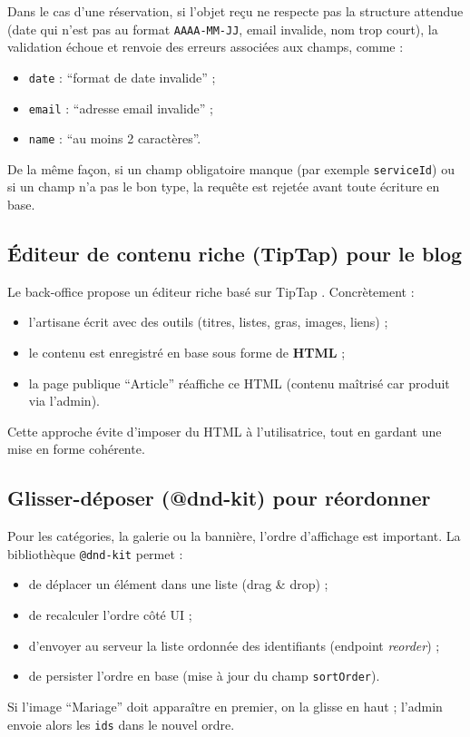 Dans le cas d’une réservation, si l’objet reçu ne respecte pas la structure attendue (date qui n’est pas au format \texttt{AAAA-MM-JJ}, email invalide, nom trop court), la validation échoue et renvoie des erreurs associées aux champs, comme :
\begin{itemize}
    \item \texttt{date} : “format de date invalide” ;
    \item \texttt{email} : “adresse email invalide” ;
    \item \texttt{name} : “au moins 2 caractères”.
\end{itemize}
De la même façon, si un champ obligatoire manque (par exemple \texttt{serviceId}) ou si un champ n’a pas le bon type, la requête est rejetée avant toute écriture en base.

\subsection{Éditeur de contenu riche (TipTap) pour le blog}
Le back-office propose un éditeur riche basé sur TipTap \cite{tiptapDocs}. Concrètement :
\begin{itemize}
    \item l’artisane écrit avec des outils (titres, listes, gras, images, liens) ;
    \item le contenu est enregistré en base sous forme de \textbf{HTML} ;
    \item la page publique “Article” réaffiche ce HTML (contenu maîtrisé car produit via l’admin).
\end{itemize}
Cette approche évite d’imposer du HTML à l’utilisatrice, tout en gardant une mise en forme cohérente.

\subsection{Glisser-déposer (@dnd-kit) pour réordonner}
Pour les catégories, la galerie ou la bannière, l’ordre d’affichage est important. La bibliothèque \texttt{@dnd-kit} \cite{dndkitDocs} permet :
\begin{itemize}
    \item de déplacer un élément dans une liste (drag \& drop) ;
    \item de recalculer l’ordre côté UI ;
    \item d’envoyer au serveur la liste ordonnée des identifiants (endpoint \textit{reorder}) ;
    \item de persister l’ordre en base (mise à jour du champ \texttt{sortOrder}).
\end{itemize}
Si l’image “Mariage” doit apparaître en premier, on la glisse en haut ; l’admin envoie alors les \texttt{ids} dans le nouvel ordre.

